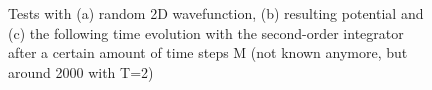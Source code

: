 \documentclass[11pt, letterpaper, onecolumn]{article}
\begin{document}
	\begin{figure}[h]	
	\begin{center}	
	\caption{Tests with (a) random 2D wavefunction, (b) resulting potential and (c) the following time evolution with the second-order integrator after a certain amount of time steps M (not known anymore, but around 2000 with T=2)}
	\label{fig:2D-so_integr}
	\end{center} 
	\end{figure}
	
\end{document}
